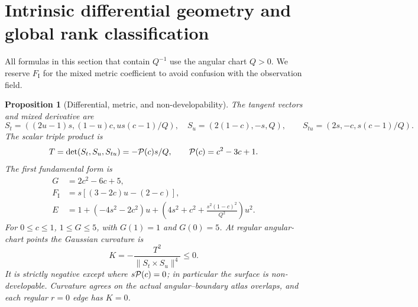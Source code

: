 \documentclass[11pt,a4paper]{article}
\newtheorem{proposition}[theorem]{Proposition}
\theoremstyle{definition}\newtheorem{definition}[theorem]{Definition}
\theoremstyle{remark}\newtheorem{remark}[theorem]{Remark}
\begin{document}
\section{Intrinsic differential geometry and global rank classification}
All formulas in this section that contain $Q^{-1}$ use the angular chart
$Q>0$. We reserve $F_{\mathrm I}$ for the mixed metric coefficient to avoid
confusion with the observation field.
\begin{proposition}[Differential, metric, and non-developability]\label{prop:metric}
The tangent vectors and mixed derivative are
\[
 S_t=((2u-1)s,(1-u)c,us(c-1)/Q),\quad S_u=(2(1-c),-s,Q),
 \qquad S_{tu}=(2s,-c,s(c-1)/Q).
\]
The scalar triple product is
\begin{equation}\label{eq:triple}
 T=\det(S_t,S_u,S_{tu})=-\mathcal P(c)s/Q,\qquad
 \mathcal P(c)=c^2-3c+1.
\end{equation}
The first fundamental form is
\begin{align*}
 G&=2c^2-6c+5,\\
 F_{\mathrm I}&=s[(3-2c)u-(2-c)],\\
 E&=1+(-4s^2-2c^2)u+
       \left(4s^2+c^2+\frac{s^2(1-c)^2}{Q^2}\right)u^2.
\end{align*}
For $0\leq c\leq1$, $1\leq G\leq5$, with $G(1)=1$ and $G(0)=5$.
At regular angular-chart points the Gaussian curvature is
\begin{equation}\label{eq:curvature}
 K=-\frac{T^2}{\lVert S_t\times S_u\rVert^4}\leq0.
\end{equation}
It is strictly negative except where $s\mathcal P(c)=0$; in particular the
surface is non-developable. Curvature agrees on the actual angular--boundary
atlas overlaps, and each regular $r=0$ edge has $K=0$.
\end{proposition}
\end{document}
